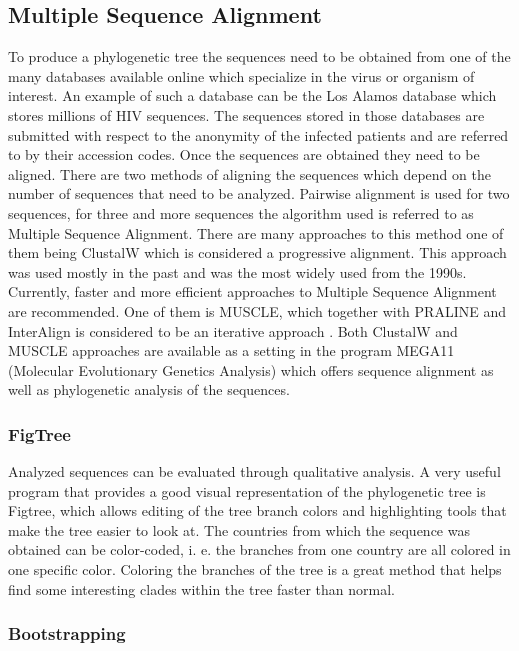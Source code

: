     \subsection{Multiple Sequence Alignment}

To produce a phylogenetic tree the sequences need to be obtained from one of the many databases available online which specialize in the virus or organism of interest. An example of such a database can be the Los Alamos database which stores millions of HIV sequences. 
The sequences stored in those databases are submitted with respect to the anonymity of the infected patients and are referred to by their accession codes. 
Once the sequences are obtained they need to be aligned.
There are two methods of aligning the sequences which depend on the number of sequences that need to be analyzed. 
Pairwise alignment is used for two sequences, for three and more sequences the algorithm used is referred to as Multiple Sequence Alignment. 
There are many approaches to this method one of them being ClustalW which is considered a progressive alignment. 
This approach was used mostly in the past and was the most widely used from the 1990s.
Currently, faster and more efficient approaches to Multiple Sequence Alignment are recommended.
One of them is MUSCLE, which together with PRALINE and InterAlign is considered to be an iterative approach \cite{pevsner_2015_bioinformatics}. 
Both ClustalW and MUSCLE approaches are available as a setting in the program MEGA11 (Molecular Evolutionary Genetics Analysis) which offers sequence alignment as well as phylogenetic analysis of the sequences.

        \subsubsection{FigTree}

Analyzed sequences can be evaluated through qualitative analysis. 
A very useful program that provides a good visual representation of the phylogenetic tree is Figtree, which allows editing of the tree branch colors and highlighting tools that make the tree easier to look at. 
The countries from which the sequence was obtained can be color-coded, i. e. the branches from one country are all colored in one specific color.
Coloring the branches of the tree is a great method that helps find some interesting clades within the tree faster than normal. 

        \subsubsection{Bootstrapping} 

